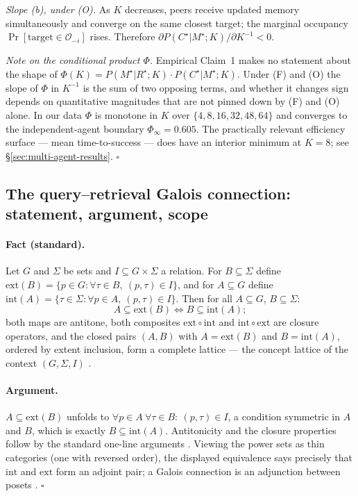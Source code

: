\documentclass{article}
\begin{document}
\emph{Slope (b), under (O).} As $K$ decreases, peers receive updated memory simultaneously and converge on the same closest target; the marginal occupancy $\Pr[\text{target}\in\mathcal{O}_{-i}]$ rises. Therefore $\partial P(C^\star|M^\star;K) / \partial K^{-1} < 0$.

\emph{Note on the conditional product $\Phi$.} Empirical Claim~1 makes no statement about the shape of $\Phi(K) = P(M^\star|R^\star;K)\!\cdot\!P(C^\star|M^\star;K)$. Under (F) and (O) the slope of $\Phi$ in $K^{-1}$ is the sum of two opposing terms, and whether it changes sign depends on quantitative magnitudes that are not pinned down by (F) and (O) alone. In our data $\Phi$ is monotone in $K$ over $\{4,8,16,32,48,64\}$ and converges to the independent-agent boundary $\Phi_\infty = 0.605$. The practically relevant efficiency surface --- mean time-to-success --- does have an interior minimum at $K=8$; see \S\ref{sec:multi-agent-results}. \hfill$\square$

\subsection{The query--retrieval Galois connection: statement, argument, scope}
\label{app:galois}

\paragraph{Fact (standard).}
Let $G$ and $\Sigma$ be sets and $I \subseteq G \times \Sigma$ a relation. For $B \subseteq \Sigma$ define $\mathrm{ext}(B) = \{p \in G : \forall \tau \in B,\ (p,\tau) \in I\}$, and for $A \subseteq G$ define $\mathrm{int}(A) = \{\tau \in \Sigma : \forall p \in A,\ (p,\tau) \in I\}$. Then for all $A \subseteq G$, $B \subseteq \Sigma$:
\[
A \subseteq \mathrm{ext}(B) \iff B \subseteq \mathrm{int}(A);
\]
both maps are antitone, both composites $\mathrm{ext}\circ\mathrm{int}$ and $\mathrm{int}\circ\mathrm{ext}$ are closure operators, and the closed pairs $(A, B)$ with $A = \mathrm{ext}(B)$ and $B = \mathrm{int}(A)$, ordered by extent inclusion, form a complete lattice --- the concept lattice of the context $(G, \Sigma, I)$ \citep{ganter1999fca}.

\paragraph{Argument.}
$A \subseteq \mathrm{ext}(B)$ unfolds to $\forall p \in A\ \forall \tau \in B:\ (p,\tau) \in I$, a condition symmetric in $A$ and $B$, which is exactly $B \subseteq \mathrm{int}(A)$. Antitonicity and the closure properties follow by the standard one-line arguments \citep[Ch.~1]{ganter1999fca}. Viewing the power sets as thin categories (one with reversed order), the displayed equivalence says precisely that $\mathrm{int}$ and $\mathrm{ext}$ form an adjoint pair; a Galois connection is an adjunction between posets \citep[Ch.~IV]{maclane1998categories}. \hfill$\square$
\end{document}
